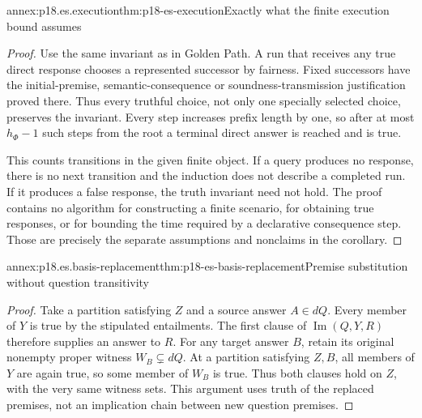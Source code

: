 \begin{annexitem}{annex:p18.es.execution}{thm:p18-es-execution}{Exactly what the finite execution bound assumes}
\begin{proof}
Use the same invariant as in Golden Path. A run that receives any true direct
response chooses a represented successor by fairness. Fixed successors have
the initial-premise, semantic-consequence or soundness-transmission justification
proved there. Thus every truthful choice, not only one specially selected
choice, preserves the invariant. Every step increases prefix length by one,
so after at most \(h_\Phi-1\) such steps from the root a terminal direct answer
is reached and is true.

This counts transitions in the given finite object. If a query produces no
response, there is no next transition and the induction does not describe a
completed run. If it produces a false response, the truth invariant need not
hold. The proof contains no algorithm for constructing a finite scenario,
for obtaining true responses, or for bounding the time required by a
declarative consequence step. Those are precisely the separate assumptions
and nonclaims in the corollary.
\end{proof}
\end{annexitem}

\begin{annexitem}{annex:p18.es.basis-replacement}{thm:p18-es-basis-replacement}{Premise substitution without question transitivity}
\begin{proof}
Take a partition satisfying \(Z\) and a source answer \(A\in dQ\).
Every member of \(Y\) is true by the stipulated entailments. The first
clause of \(\operatorname{Im}(Q,Y,R)\) therefore supplies an answer to
\(R\). For any target answer \(B\), retain its original nonempty proper
witness \(W_B\subsetneq dQ\). At a partition satisfying \(Z,B\), all
members of \(Y\) are again true, so some member of \(W_B\) is true.
Thus both clauses hold on \(Z\), with the very same witness sets. This
argument uses truth of the replaced premises, not an implication chain
between new question premises.
\end{proof}
\end{annexitem}

